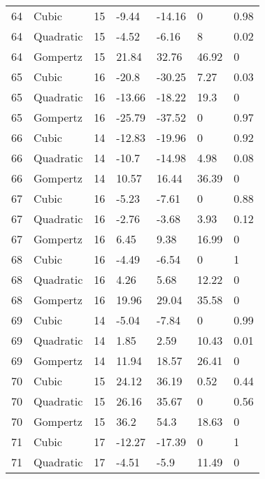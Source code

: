 \documentclass[11pt]{article}
\begin{document}
\begin{center}
\begin{longtable}{lllllll}
    64  & Cubic     & 15              & -9.44   & -14.16  & 0       & 0.98 \\
    64  & Quadratic & 15              & -4.52   & -6.16   & 8       & 0.02 \\
    64  & Gompertz  & 15              & 21.84   & 32.76   & 46.92   & 0    \\
    65  & Cubic     & 16              & -20.8   & -30.25  & 7.27    & 0.03 \\
    65  & Quadratic & 16              & -13.66  & -18.22  & 19.3    & 0    \\
    65  & Gompertz  & 16              & -25.79  & -37.52  & 0       & 0.97 \\
    66  & Cubic     & 14              & -12.83  & -19.96  & 0       & 0.92 \\
    66  & Quadratic & 14              & -10.7   & -14.98  & 4.98    & 0.08 \\
    66  & Gompertz  & 14              & 10.57   & 16.44   & 36.39   & 0    \\
    67  & Cubic     & 16              & -5.23   & -7.61   & 0       & 0.88 \\
    67  & Quadratic & 16              & -2.76   & -3.68   & 3.93    & 0.12 \\
    67  & Gompertz  & 16              & 6.45    & 9.38    & 16.99   & 0    \\
    68  & Cubic     & 16              & -4.49   & -6.54   & 0       & 1    \\
    68  & Quadratic & 16              & 4.26    & 5.68    & 12.22   & 0    \\
    68  & Gompertz  & 16              & 19.96   & 29.04   & 35.58   & 0    \\
    69  & Cubic     & 14              & -5.04   & -7.84   & 0       & 0.99 \\
    69  & Quadratic & 14              & 1.85    & 2.59    & 10.43   & 0.01 \\
    69  & Gompertz  & 14              & 11.94   & 18.57   & 26.41   & 0    \\
    70  & Cubic     & 15              & 24.12   & 36.19   & 0.52    & 0.44 \\
    70  & Quadratic & 15              & 26.16   & 35.67   & 0       & 0.56 \\
    70  & Gompertz  & 15              & 36.2    & 54.3    & 18.63   & 0    \\
    71  & Cubic     & 17              & -12.27  & -17.39  & 0       & 1    \\
    71  & Quadratic & 17              & -4.51   & -5.9    & 11.49   & 0    \\

\end{longtable}
\end{center}
\end{document}

